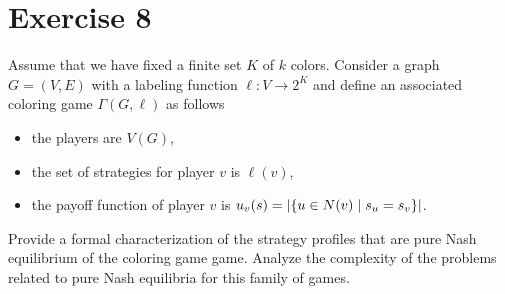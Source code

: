 \documentclass[a4paper, 10pt]{article}
\begin{document}
\section{Exercise 8}
{\color{statement} Assume that we have fixed a finite set $K$ of $k$ colors. Consider a graph $G = (V, E)$ with a labeling function $\ell: V \rightarrow 2^K$ and define an associated coloring game $\Gamma(G, \ell)$ as follows
\begin{itemize}
    \item the players are $V(G)$,
    \item the set of strategies for player $v$ is $\ell(v)$,
    \item the payoff function of player $v$ is $u_v(s) = |\{u \in N(v)\hspace{1mm}|\hspace{1mm}s_u = s_v \}|$.
\end{itemize}

Provide a formal characterization of the strategy profiles that are pure Nash equilibrium of the coloring game game. Analyze the complexity of the problems related to pure Nash equilibria for this family of games.}



\end{document}
